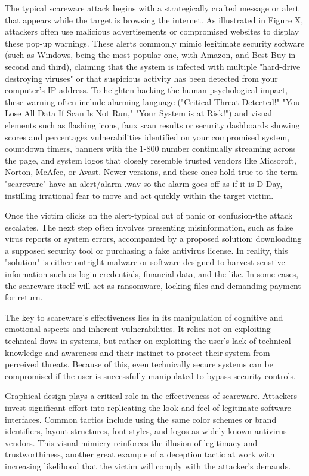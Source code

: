 {The typical scareware attack begins with a strategically crafted message or alert that appears while the target is browsing the internet. As illustrated in Figure X, attackers often use malicious advertisements or compromised websites to display these pop-up warnings. These alerts commonly mimic legitimate security software (such as Windows, being the most popular one, with Amazon, and Best Buy in second and third), claiming that the system is infected with multiple "hard-drive destroying viruses" or that suspicious activity has been detected from your computer's IP address. To heighten hacking the human psychological impact, these warning often include alarming language ("Critical Threat Detected!" "You Lose All Data If Scan Is Not Run," "Your System is at Risk!") and visual elements such as flashing icons, faux scan results or security dashboards showing scores and percentages vulnerabilities identified on your compromised system, countdown timers, banners with the 1-800 number continually streaming across the page, and system logos that closely resemble trusted vendors like Micsoroft, Norton, McAfee, or Avast. Newer versions, and these ones hold true to the term "scareware" have an alert/alarm .wav so the alarm goes off as if it is D-Day, instilling irrational fear to move and act quickly within the target victim.

Once the victim clicks on the alert-typical out of panic or confusion-the attack escalates. The next step often involves presenting misinformation, such as false virus reports or system errors, accompanied by a proposed solution: downloading a supposed security tool or purchasing a fake antivirus license. In reality, this "solution" is either outright malware or software designed to harvest senstive information such as login credentials, financial data, and the like. In some cases, the scareware itself will act as ransomware, locking files and demanding payment for return.

The key to scareware's effectiveness lies in its manipulation of cognitive and emotional aspects and inherent vulnerabilities. It relies not on exploiting technical flaws in systems, but rather on exploiting the user's lack of technical knowledge and awareness and their instinct to protect their system from perceived threats. Because of this, even technically secure systems can be compromised if the user is successfully manipulated to bypass security controls.

Graphical design plays a critical role in the effectiveness of scareware. Attackers invest significant effort into replicating the look and feel of legitimate software interfaces. Common tactics include using the same color schemes or brand identifiers, layout structures, font styles, and logos as widely known antivirus vendors. This visual mimicry reinforces the illusion of legitimacy and trustworthiness, another great example of a deception tactic at work with increasing likelihood that the victim will comply with the attacker's demands.

}
